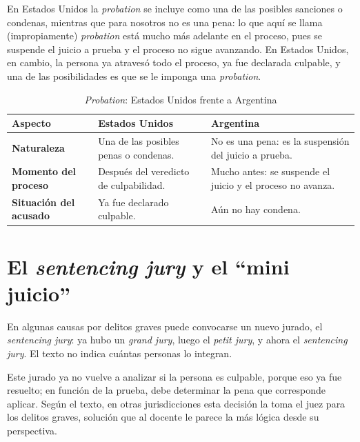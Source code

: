 \documentclass[12pt,oneside]{book}
\begin{document}
En Estados Unidos la \textit{probation} se incluye como una de las posibles sanciones o condenas, mientras que para nosotros no es una pena: lo que aquí se llama (impropiamente) \textit{probation} está mucho más adelante en el proceso, pues se suspende el juicio a prueba y el proceso no sigue avanzando. En Estados Unidos, en cambio, la persona ya atravesó todo el proceso, ya fue declarada culpable, y una de las posibilidades es que se le imponga una \textit{probation}.

\begin{table}[H]
\centering
\small
\caption{\textit{Probation}: Estados Unidos frente a Argentina}
\begin{tabularx}{\textwidth}{>{\raggedright\arraybackslash}p{} L L}
\toprule
\textbf{Aspecto} & \textbf{Estados Unidos} & \textbf{Argentina} \\
\midrule
\textbf{Naturaleza} & Una de las posibles penas o condenas. & No es una pena: es la suspensión del juicio a prueba. \\
\addlinespace
\textbf{Momento del proceso} & Después del veredicto de culpabilidad. & Mucho antes: se suspende el juicio y el proceso no avanza. \\
\addlinespace
\textbf{Situación del acusado} & Ya fue declarado culpable. & Aún no hay condena. \\
\bottomrule
\end{tabularx}
\end{table}

\section{El \textit{sentencing jury} y el ``mini juicio''}

En algunas causas por delitos graves puede convocarse un nuevo jurado, el \textit{sentencing jury}: ya hubo un \textit{grand jury}, luego el \textit{petit jury}, y ahora el \textit{sentencing jury}. El texto no indica cuántas personas lo integran. %

Este jurado ya no vuelve a analizar si la persona es culpable, porque eso ya fue resuelto; en función de la prueba, debe determinar la pena que corresponde aplicar. Según el texto, en otras jurisdicciones esta decisión la toma el juez para los delitos graves, solución que al docente le parece la más lógica desde su perspectiva. %
\end{document}
